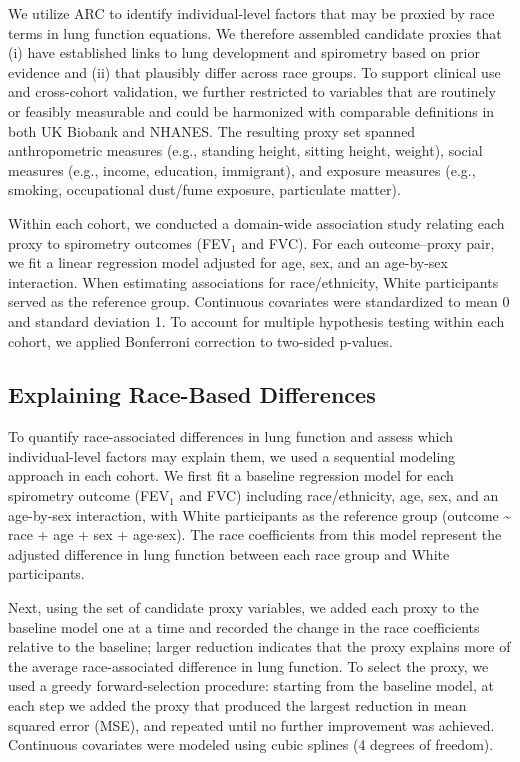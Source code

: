 \documentclass[10pt]{extarticle}
\begin{document}
We utilize ARC to identify individual-level factors that may be proxied by race terms in lung function equations. We therefore assembled candidate proxies that (i) have established links to lung development and spirometry based on prior evidence and (ii) that plausibly differ across race groups. To support clinical use and cross-cohort validation, we further restricted to variables that are routinely or feasibly measurable and could be harmonized with comparable definitions in both UK Biobank and NHANES. The resulting proxy set spanned anthropometric measures (e.g., standing height, sitting height, weight), social measures (e.g., income, education, immigrant), and exposure measures (e.g., smoking, occupational dust/fume exposure, particulate matter)\cite{Whitrow2008-hm,Harik-Khan2001-bp,Holland2022-nt,Menezes2015-ea}.

Within each cohort, we conducted a domain-wide association study relating each proxy to spirometry outcomes (FEV$_{1}$ and FVC). For each outcome--proxy pair, we fit a linear regression model adjusted for age, sex, and an age-by-sex interaction. When estimating associations for race/ethnicity, White participants served as the reference group. Continuous covariates were standardized to mean 0 and standard deviation 1. To account for multiple hypothesis testing within each cohort, we applied Bonferroni correction to two-sided p-values\cite{Bonferroni1936-mo}.

\subsection{Explaining Race-Based Differences}\label{explaining-race-based-differences}

To quantify race-associated differences in lung function and assess which individual-level factors may explain them, we used a sequential modeling approach in each cohort. We first fit a baseline regression model for each spirometry outcome (FEV$_{1}$ and FVC) including race/ethnicity, age, sex, and an age-by-sex interaction, with White participants as the reference group (outcome \textasciitilde{} race + age + sex + age$\cdot$sex). The race coefficients from this model represent the adjusted difference in lung function between each race group and White participants.

Next, using the set of candidate proxy variables, we added each proxy to the baseline model one at a time and recorded the change in the race coefficients relative to the baseline; larger reduction indicates that the proxy explains more of the average race-associated difference in lung function. To select the proxy, we used a greedy forward-selection procedure: starting from the baseline model, at each step we added the proxy that produced the largest reduction in mean squared error (MSE), and repeated until no further improvement was achieved. Continuous covariates were modeled using cubic splines (4 degrees of freedom).
\end{document}
